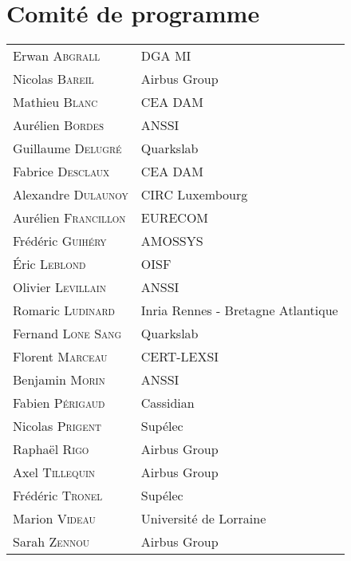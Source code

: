 \section*{Comité de programme}
\begin{tabular}{@{}p{5cm}@{}p{6.5cm}@{}}
  Erwan \textsc{Abgrall}          & DGA MI                                       \\
  Nicolas \textsc{Bareil}         & Airbus Group                                 \\
  Mathieu \textsc{Blanc}          & CEA DAM                                      \\
  Aurélien \textsc{Bordes}        & ANSSI                                        \\
  Guillaume \textsc{Delugré}      & Quarkslab                                    \\
  Fabrice \textsc{Desclaux}       & CEA DAM                                      \\
  Alexandre \textsc{Dulaunoy}     & CIRC Luxembourg                              \\
  Aurélien \textsc{Francillon}    & EURECOM                                      \\
  Frédéric \textsc{Guihéry}       & AMOSSYS                                      \\
  Éric \textsc{Leblond}           & OISF                                         \\
  Olivier \textsc{Levillain}      & ANSSI                                        \\
  Romaric \textsc{Ludinard}       & Inria Rennes - Bretagne Atlantique           \\
  Fernand \textsc{Lone Sang}      & Quarkslab                                    \\
  Florent \textsc{Marceau}        & CERT-LEXSI                                   \\
  Benjamin \textsc{Morin}         & ANSSI                                        \\
  Fabien \textsc{Périgaud}        & Cassidian                                   \\
  Nicolas \textsc{Prigent}        & Sup\'elec                                    \\
  Raphaël \textsc{Rigo}           & Airbus Group                                 \\
  Axel \textsc{Tillequin}         & Airbus Group                                 \\
  Fr\'ed\'eric \textsc{Tronel}    & Sup\'elec                                    \\
  Marion \textsc{Videau}          & Université de Lorraine                       \\
  Sarah \textsc{Zennou}           & Airbus Group                                 \\
\end{tabular}

